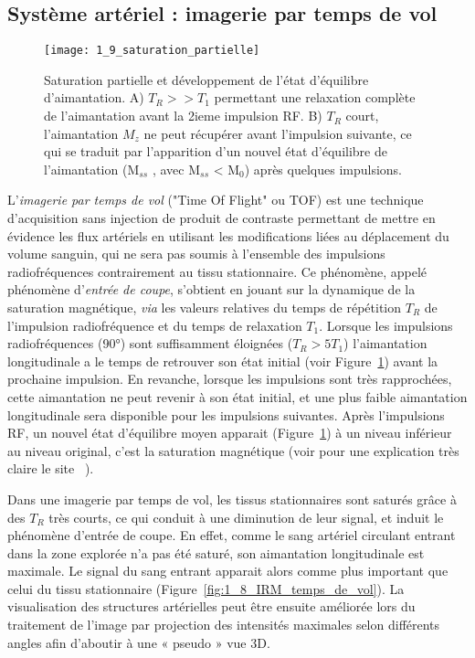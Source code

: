 \subsection{Système artériel : imagerie par temps de vol}
\begin{figure}[!t]
\centering
\texttt{[image: 1\_9\_saturation\_partielle]}
\caption{Saturation partielle et développement de l'état d'équilibre d'aimantation. A) $T_R  >> T_1$ permettant une relaxation complète de l'aimantation avant la 2ieme impulsion RF. B) $T_R$ court, l'aimantation $M_z$ ne peut récupérer avant l’impulsion suivante, ce qui se traduit par l’apparition d’un nouvel état d’équilibre de l'aimantation (M$_{ss}$ , avec M$_{ss}$ < M$_{0}$) après quelques impulsions. }
\label{fig:1_9_saturation_partielle}	
\end{figure}
L’{\em imagerie par temps de vol} ("Time Of Flight" ou TOF) est une technique d’acquisition sans injection de produit de contraste permettant de mettre en évidence les flux artériels en utilisant les modifications liées au déplacement du volume sanguin, qui ne sera pas soumis à l’ensemble des impulsions radiofréquences contrairement au tissu stationnaire. Ce phénomène, appelé phénomène d’{\em entrée de coupe}, s'obtient en jouant sur la dynamique de la saturation magnétique, {\em via} les valeurs relatives du temps de répétition $T_R$ de l'impulsion radiofréquence et du temps de relaxation $T_1$. Lorsque les impulsions radiofréquences (90°) sont suffisamment éloignées ($T_R > 5  T_1$) l'aimantation longitudinale a le temps de retrouver son état initial (voir Figure~\ref{fig:1_9_saturation_partielle}) avant la prochaine impulsion. En revanche, lorsque les impulsions sont très rapprochées, cette aimantation ne peut revenir à son état initial, et une plus faible aimantation longitudinale sera disponible pour les impulsions suivantes. Après l'impulsions RF, un nouvel état d’équilibre moyen apparait (Figure~\ref{fig:1_9_saturation_partielle}) à un niveau inférieur au niveau original, c’est la saturation magnétique (voir pour une explication très claire le site ~\cite{timeflighteffects}).

Dans une imagerie par temps de vol, les tissus stationnaires sont saturés grâce à des $T_R$ très courts, ce qui conduit à une diminution de leur signal, et induit le phénomène d’entrée de coupe. En effet, comme le sang artériel circulant entrant dans la zone explorée n’a pas été saturé, son aimantation longitudinale est maximale. Le signal du sang entrant apparait alors comme plus important que celui du tissu stationnaire (Figure~\ref{fig:1_8_IRM_temps_de_vol}). La visualisation des structures artérielles peut être ensuite améliorée lors du traitement de l'image par projection des intensités maximales selon différents angles afin d’aboutir à une « pseudo » vue 3D.

